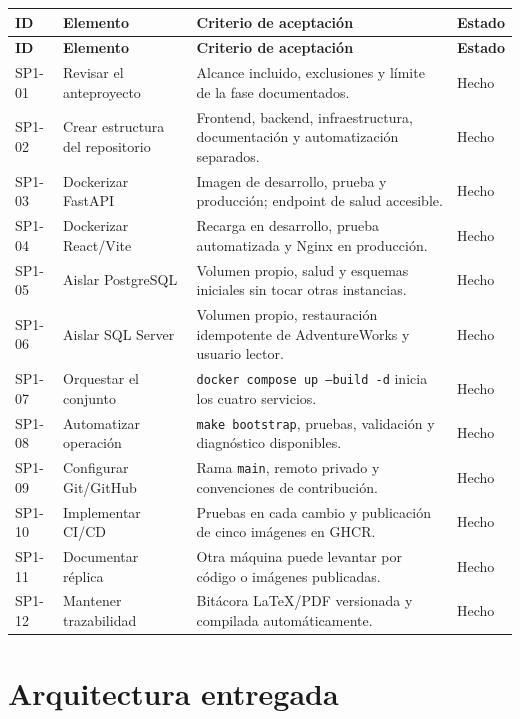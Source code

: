 \documentclass[11pt,letterpaper]{article}
\newcommand{\file}[1]{\texttt{#1}}
\begin{document}
\begin{longtable}{@{}p{}p{}p{}p{}@{}}
  \toprule
  \textbf{ID} & \textbf{Elemento} & \textbf{Criterio de aceptación} & \textbf{Estado} \\
  \midrule
  \endfirsthead
  \toprule
  \textbf{ID} & \textbf{Elemento} & \textbf{Criterio de aceptación} & \textbf{Estado} \\
  \midrule
  \endhead
  SP1-01 & Revisar el anteproyecto & Alcance incluido, exclusiones y límite de la fase documentados. & Hecho \\
  SP1-02 & Crear estructura del repositorio & Frontend, backend, infraestructura, documentación y automatización separados. & Hecho \\
  SP1-03 & Dockerizar FastAPI & Imagen de desarrollo, prueba y producción; endpoint de salud accesible. & Hecho \\
  SP1-04 & Dockerizar React/Vite & Recarga en desarrollo, prueba automatizada y Nginx en producción. & Hecho \\
  SP1-05 & Aislar PostgreSQL & Volumen propio, salud y esquemas iniciales sin tocar otras instancias. & Hecho \\
  SP1-06 & Aislar SQL Server & Volumen propio, restauración idempotente de AdventureWorks y usuario lector. & Hecho \\
  SP1-07 & Orquestar el conjunto & \file{docker compose up --build -d} inicia los cuatro servicios. & Hecho \\
  SP1-08 & Automatizar operación & \file{make bootstrap}, pruebas, validación y diagnóstico disponibles. & Hecho \\
  SP1-09 & Configurar Git/GitHub & Rama \file{main}, remoto privado y convenciones de contribución. & Hecho \\
  SP1-10 & Implementar CI/CD & Pruebas en cada cambio y publicación de cinco imágenes en GHCR. & Hecho \\
  SP1-11 & Documentar réplica & Otra máquina puede levantar por código o imágenes publicadas. & Hecho \\
  SP1-12 & Mantener trazabilidad & Bitácora LaTeX/PDF versionada y compilada automáticamente. & Hecho \\
  \bottomrule
\end{longtable}

\section{Arquitectura entregada}
\end{document}
